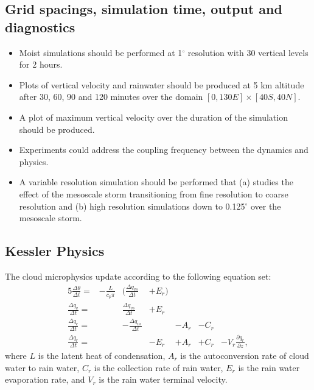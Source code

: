 \documentclass[times,doublespace]{fldauth}
\newcommand{\pdiff}[2]{\frac{\partial #1}{\partial #2}}
\begin{document}
{\subsection{Grid spacings, simulation time, output and diagnostics}

\begin{itemize}
\item Moist simulations should be performed at 1$^\circ$ resolution with 30 vertical levels for 2 hours.
\item Plots of vertical velocity and rainwater should be produced at 5 km altitude after 30, 60, 90 and 120 minutes over the domain $[0, 130E] \times [40S, 40N]$.
\item A plot of maximum vertical velocity over the duration of the simulation should be produced.
\item Experiments could address the coupling frequency between the dynamics and physics.
\item A variable resolution simulation should be performed that (a) studies the effect of the mesoscale storm transitioning from fine resolution to coarse resolution and (b) high resolution simulations down to 0.125$^\circ$ over the mesoscale storm.
\end{itemize}







\begin{appendix}


\section{Kessler Physics} \label{sec:KesslerPhysics}

The cloud microphysics update according to the following equation set:
\begin{alignat}{5}
\frac{\Delta \theta}{\Delta t} = & - \frac{L}{c_p \pi} & \Big( \frac{\Delta q_{vs}}{\Delta t} & + E_r  \Big) & \\
\frac{\Delta q_v}{\Delta t} = & & \frac{\Delta q_{vs}}{\Delta t} & + E_r \\
\frac{\Delta q_c}{\Delta t} = & & - \frac{\Delta q_{vs}}{\Delta t} & & - A_r & - C_r \\
\frac{\Delta q_r}{\Delta t} = & & & - E_r & + A_r & + C_r & - V_r \pdiff{q_r}{z},
\end{alignat} where $L$ is the latent heat of condensation, $A_r$ is the autoconversion rate of cloud water to rain water, $C_r$ is the collection rate of rain water, $E_r$ is the rain water evaporation rate, and $V_r$ is the rain water terminal velocity.


\end{appendix}}
\end{document}
